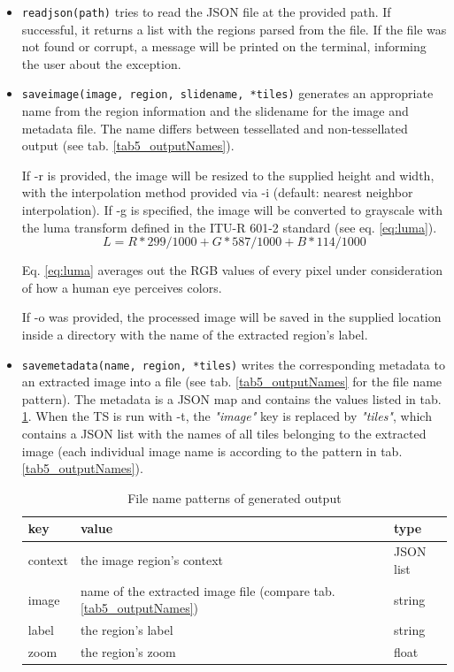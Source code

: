 \begin{itemize}
	\item \texttt{read{\textunderscore}json(path)} tries to read the JSON file at the provided path. If successful, it returns a list with the regions parsed from the file. If the file was not found or corrupt, a message will be printed on the terminal, informing the user about the exception.
	
	\item \texttt{save{\textunderscore}image(image, region, slide{\textunderscore}name, *tiles)} generates an appropriate name from the region information and the slide{\textunderscore}name for the image and metadata file. The name differs between tessellated and non-tessellated output (see tab. \ref{tab5_outputNames}).
	
	If -r is provided, the image will be resized to the supplied height and width, with the interpolation method provided via -i (default: nearest neighbor interpolation). If -g is specified, the image will be converted to grayscale with the luma transform defined in the ITU-R 601-2 standard\cite{ITUR94} (see eq. \ref{eq:luma}).
	\begin{equation}\label{eq:luma}
		L = R * 299/1000 + G * 587/1000 + B * 114/1000
	\end{equation}
	
	Eq. \ref{eq:luma} averages out the RGB values of every pixel under consideration of how a human eye perceives colors.
	
	If -o was provided, the processed image will be saved in the supplied location inside a directory with the name of the extracted region's label.
	
	\item \texttt{save{\textunderscore}metadata(name, region, *tiles)} writes the corresponding metadata to an extracted image into a file (see tab. \ref{tab5_outputNames} for the file name pattern). The metadata is a JSON map and contains the values listed in tab. \ref{tab5_metadataJson}. When the TS is run with -t, the \emph{"image"} key is replaced by \emph{"tiles"}, which contains a JSON list with the names of all tiles belonging to the extracted image (each individual image name is according to the pattern in tab. \ref{tab5_outputNames}).
	
	\begin{table}[H]
		\begin{center}
			\begin{tabular}{| l | p{6cm} | l |}
				\hline
				\textbf{key} & \textbf{value} & \textbf{type}\\ \hline
				context & the image region's context & JSON list\\ \hline
				image & name of the extracted image file (compare tab. \ref{tab5_outputNames}) & string \\ \hline
				label & the region's label & string\\ \hline
				zoom & the region's zoom & float\\ \hline
			\end{tabular}
			\caption{File name patterns of generated output}
			\label{tab5_metadataJson}
		\end{center}
	\end{table}
	

\end{itemize}
